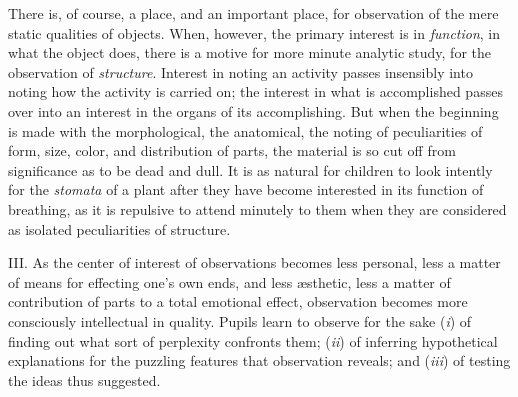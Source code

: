 \documentclass[letterpaper]{book}
\begin{document}
There is, of course, a place, and an important place, for observation of
the mere static qualities of objects. When, however, the primary
interest is in \emph{function}, in what the object does, there is a
motive for more minute analytic study, for the observation of
\emph{structure}. Interest in noting an activity passes insensibly into
noting how the activity is carried on; the interest in what is
accomplished passes over into an interest in the organs of its
accomplishing. But when the beginning is made with the morphological,
the anatomical, the noting of peculiarities of form, size, color, and
distribution of parts, the material is so cut off from significance as
to be dead and dull. It is as natural for children to look intently for
the \emph{stomata} of a plant after they have become interested in its
function of breathing, as it is repulsive to attend minutely to them
when they are considered as isolated peculiarities of
structure.


III. As the center of interest of observations becomes less personal,
less a matter of means for effecting one's own ends, and less æsthetic,
less a matter of contribution of parts to a total emotional effect,
observation becomes more consciously intellectual in quality. Pupils
learn to observe for the sake (\emph{i}) of finding out what sort of
perplexity confronts them; (\emph{ii}) of inferring hypothetical
explanations for the puzzling features that observation reveals; and
(\emph{iii}) of testing the ideas thus suggested.


\end{document}
